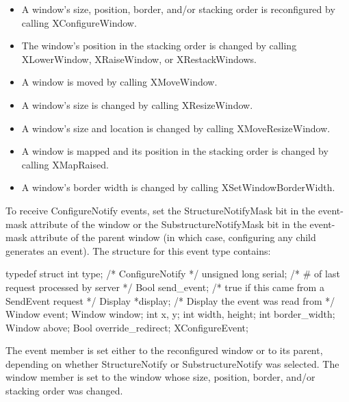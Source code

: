 \documentclass{report}
\begin{document}
\begin{itemize}
            \begin{itemize}
                \item A window’s size, position, border, and/or stacking order is reconfigured by calling XConfigureWindow.
                \item The window’s position in the stacking order is changed by calling XLowerWindow, XRaiseWindow, or XRestackWindows.
                \item A window is moved by calling XMoveWindow.
                \item A window’s size is changed by calling XResizeWindow.
                \item A window’s size and location is changed by calling XMoveResizeWindow.
                \item A window is mapped and its position in the stacking order is changed by calling XMapRaised.
                \item A window’s border width is changed by calling XSetWindowBorderWidth.
            \end{itemize}
            To receive ConfigureNotify events, set the StructureNotifyMask bit in the event-mask attribute of the window or the SubstructureNotifyMask bit in the event-mask attribute of the parent window (in which case, configuring any child generates an event).
            \bigbreak \noindent 
            The structure for this event type contains:
            \bigbreak \noindent 
            \begin{cppcode}
                typedef struct {
                    int type;               /* ConfigureNotify */
                    unsigned long serial;   /* # of last request processed by server */
                    Bool send_event;        /* true if this came from a SendEvent request */
                    Display *display;       /* Display the event was read from */
                    Window event;
                    Window window;
                    int x, y;
                    int width, height;
                    int border_width;
                    Window above;
                    Bool override_redirect;
                } XConfigureEvent;
            \end{cppcode}
            \bigbreak \noindent 
            The event member is set either to the reconfigured window or to its parent, depending on whether StructureNotify or SubstructureNotify was selected. The window member is set to the window whose size, position, border, and/or stacking order was changed.
            \bigbreak \noindent 

\end{itemize}
\end{document}
